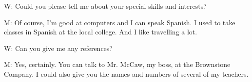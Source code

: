 \documentclass[12pt]{article}
\begin{document}
\vspace{0.00mm}
\setlength{\parindent}{0.00mm}
\setlength{\leftskip}{-6.23mm}
\setlength{\rightskip}{0.00mm}

W: Could you please tell me about your special skills and interests?
\vspace{0.00mm}

\vspace{0.00mm}
\setlength{\parindent}{0.00mm}
\setlength{\leftskip}{-6.23mm}
\setlength{\rightskip}{0.00mm}


\vspace{0.00mm}

\vspace{0.00mm}
\setlength{\parindent}{0.00mm}
\setlength{\leftskip}{-6.23mm}
\setlength{\rightskip}{0.00mm}

M: Of course, I'm good at computers and I can speak Spanish. I used to take classes in Spanish at the local college. And I like travelling a lot.
\vspace{0.00mm}

\vspace{0.00mm}
\setlength{\parindent}{0.00mm}
\setlength{\leftskip}{-6.23mm}
\setlength{\rightskip}{0.00mm}


\vspace{0.00mm}

\vspace{0.00mm}
\setlength{\parindent}{0.00mm}
\setlength{\leftskip}{-6.23mm}
\setlength{\rightskip}{0.00mm}

W: Can you give me any references?
\vspace{0.00mm}

\vspace{0.00mm}
\setlength{\parindent}{0.00mm}
\setlength{\leftskip}{-6.23mm}
\setlength{\rightskip}{0.00mm}


\vspace{0.00mm}

\vspace{0.00mm}
\setlength{\parindent}{0.00mm}
\setlength{\leftskip}{-6.23mm}
\setlength{\rightskip}{0.00mm}

M: Yes, certainly. You can talk to Mr. McCaw, my boss, at the Brownstone Company. I could also give you the names and numbers of several of my teachers.
\vspace{0.00mm}

\vspace{0.00mm}
\setlength{\parindent}{0.00mm}
\setlength{\leftskip}{-6.23mm}
\setlength{\rightskip}{0.00mm}
\end{document}
